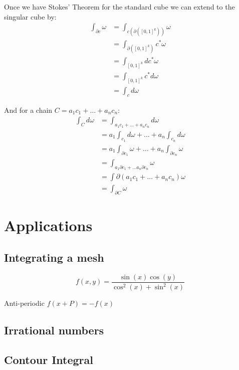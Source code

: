 Once we have Stokes' Theorem for the standard cube we can extend to the singular cube by:
\begin{align*}
	\int_{\partial c} \omega
		&= \int_{c (\partial ([0,1]^k))} \omega \\
		&= \int_{\partial( [0,1]^k)} c^* \omega \\
		&= \int_{[0,1]^k} dc^* \omega \\
		&= \int_{[0,1]^k} c^* d \omega \\
		&= \int_c d\omega
\end{align*}

And for a chain $C=a_1 c_1 + \ldots + a_n c_n$:
\begin{align*}
	\int_C d\omega 
		&= \int_{a_1c_1 + \ldots + a_nc_n	} d\omega \\
		&= a_1 \int_{c_1} d\omega + \ldots + a_n \int_{c_n} d\omega \\
		&= a_1 \int_{\partial c_1} \omega + \ldots + a_n \int_{\partial c_n} \omega \\
		&= \int_{a_1 \partial c_1 + \ldots a_n \partial c_n} \omega \\
		&= \int{\partial ( a_1c_1 + \ldots + a_n c_n)} \omega \\
		&= \int_{\partial C} \omega
\end{align*}


\section{Applications}

\subsection{Integrating a mesh}

\begin{equation}
	f(x,y) = \frac{\sin(x) \cos(y)}{\cos^2(x) + \sin^2(x)}
\end{equation}

Anti-periodic $f(x+P) = -f(x)$

\subsection{Irrational numbers}

\subsection{Contour Integral}







